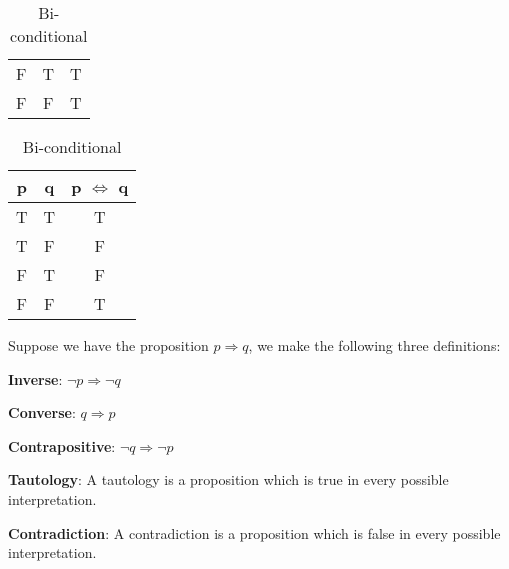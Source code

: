 \begin{defn}
\begin{table}[!htb]
\begin{minipage}{0.38\textwidth}
\begin{tabular}{|c c|c|}
         F & T & T\\
         F & F & T\\
         \hline
      \end{tabular}
      \caption{\label{mod1:tab:Conditional}Conditional}
   \end{minipage}
   \begin{minipage}{0.38\textwidth}
      \centering
      \begin{tabular}{|c c|c|}
         \hline
         p & q & p $\Leftrightarrow$ q\\
         \hline
         T & T & T\\
         T & F & F\\
         F & T & F\\
         F & F & T\\
         \hline
      \end{tabular}
      \caption{\label{mod1:tab:Bi-conditional}Bi-conditional}
   \end{minipage}
\end{table}
\end{defn}


\noindent Suppose we have the proposition $p \Rightarrow q$, we make the following three definitions:
\begin{defn}\label{mod1:defn:Inverse}
   \textbf{Inverse}: $\lnot p \Rightarrow \lnot q$ 
\end{defn}

\begin{defn}\label{mod1:defn:Converse}
   \textbf{Converse}: $q \Rightarrow p$ 
\end{defn}

\begin{defn}\label{mod1:defn:Contrapositive}
   \textbf{Contrapositive}: $\lnot q \Rightarrow \lnot p$ 
\end{defn}

\begin{defn}\label{mod1:defn:Tautology}
   \textbf{Tautology}: A tautology is a proposition which is true in every possible interpretation.
\end{defn}

\begin{defn}\label{mod1:defn:Contradiction}
   \textbf{Contradiction}: A contradiction is a proposition which is false in every possible interpretation.
\end{defn}





